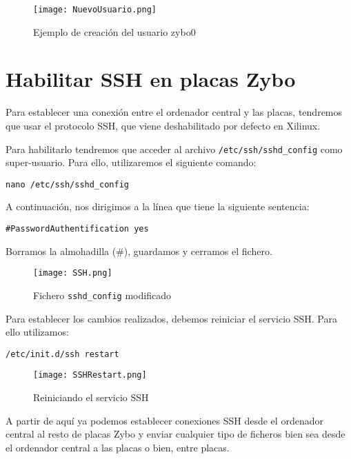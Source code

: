\documentclass[12pt,letterpaper]{article}
\begin{document}
\begin{figure}[h]
	\centering
	\texttt{[image: NuevoUsuario.png]}
	\caption{Ejemplo de creación del usuario zybo0}
	\label{Ejemplo de creación del usuario zybo0}
\end{figure}


\section{Habilitar SSH en placas Zybo}
Para establecer una conexión entre el ordenador central y las placas, tendremos que usar el protocolo SSH, que viene deshabilitado por defecto en Xilinux.

Para habilitarlo tendremos que acceder al archivo \texttt{/etc/ssh/sshd\_config} como super-usuario. Para ello, utilizaremos el siguiente comando:
\begin{center}
	\texttt{nano /etc/ssh/sshd\_config}
\end{center}
A continuación, nos dirigimos a la línea que tiene la siguiente sentencia:
\begin{center}
	\texttt{\#PasswordAuthentification yes}
\end{center}
Borramos la almohadilla (\#), guardamos y cerramos el fichero.
\begin{figure}[h]
	\centering
	\texttt{[image: SSH.png]}
	\caption{Fichero \texttt{sshd\_config} modificado}
	\label{Fichero ssh_d modificado}
\end{figure}

Para establecer los cambios realizados, debemos reiniciar el servicio SSH. Para ello utilizamos:
\begin{center}
	\texttt{/etc/init.d/ssh restart}
\end{center}
\begin{figure}[h]
	\centering
	\texttt{[image: SSHRestart.png]}
	\caption{Reiniciando el servicio SSH}
	\label{Reiniciando el servicio SSH}
\end{figure}

A partir de aquí ya podemos establecer conexiones SSH desde el ordenador central al resto de placas Zybo y enviar cualquier tipo de ficheros bien sea desde el ordenador central a las placas o bien, entre placas.
\end{document}
